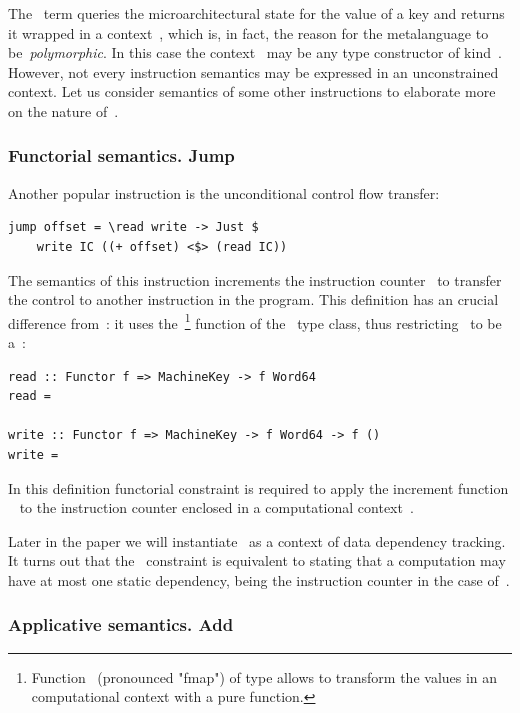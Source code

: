 The~ term queries the microarchitectural state for the value of a key and
returns it wrapped in a context~, which is, in fact, the reason for the
metalanguage to be~\emph{polymorphic}. In this case the context~ may be any
type constructor of kind~\hs{* -> *}. However, not every instruction semantics may
be expressed in an unconstrained context. Let us consider semantics of some other
instructions to elaborate more on the nature of~.

\subsubsection{Functorial semantics. Jump}

Another popular instruction is the unconditional control flow transfer:

\begin{verbatim}
jump offset = \read write -> Just $
    write IC ((+ offset) <$> (read IC))
\end{verbatim}

The semantics of this instruction increments the instruction counter~
to transfer the control to another instruction in the program. This definition
has an crucial difference from~: it uses
the~\hs{<$>}\footnote{Function~\hs{<$>} (pronounced "fmap") of type
 allows to transform the values in an
computational context with a pure function.} function of the~ type
class, thus restricting~ to be a~:

\begin{verbatim}
read :: Functor f => MachineKey -> f Word64
read =

write :: Functor f => MachineKey -> f Word64 -> f ()
write =
\end{verbatim}

In this definition functorial constraint is required to apply the increment function
~ to the instruction counter enclosed in a computational
context~.

Later in the paper we will instantiate~ as a context of data dependency
tracking. It turns out that the~ constraint is equivalent to stating
that a computation may have at most one static dependency, being the instruction
counter in the case of~.

\subsubsection{Applicative semantics. Add}

